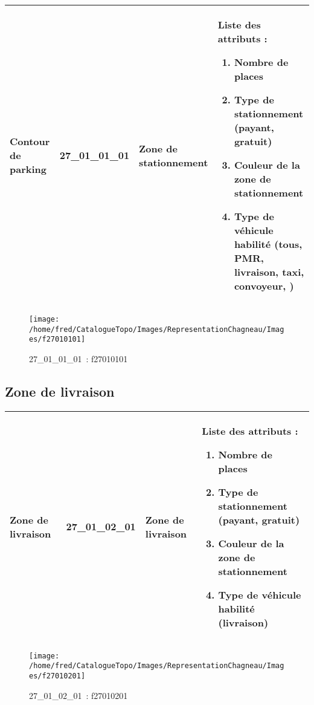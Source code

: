 \documentclass[12pt,titlepage]{book}
\begin{document}
\renewcommand{\arraystretch}{1.2}
\begin{supertabular}{|p{10cm}|c|p{13cm}|p{12cm}|}
 Contour de parking & 27\_01\_01\_01 & Zone de stationnement & Liste des attributs :
\begin{enumerate}
  \item Nombre de places  \item Type de stationnement (payant, gratuit)  \item Couleur de la zone de stationnement  \item Type de véhicule habilité (tous, PMR, livraison, taxi, convoyeur, )\end{enumerate}
\\
\hline
\end{supertabular}
\begin{figure}[h!]
  \hfill         %
  \begin{minipage}[t]{3cm}
    \begin{center}
      \texttt{[image: /home/fred/CatalogueTopo/Images/RepresentationChagneau/Images/f27010101]}
      \caption[~27\_01\_01\_01]{\small{27\_01\_01\_01~:} \tiny{f27010101}}\label{f27010101}
    \end{center}
  \end{minipage}
\end{figure}


\subsection{Zone de livraison}
\noindent
\vspace{\baselineskip}

\renewcommand{\arraystretch}{1.2}
\begin{supertabular}{|p{10cm}|c|p{13cm}|p{12cm}|}
 Zone de livraison & 27\_01\_02\_01 & Zone de livraison & Liste des attributs :
\begin{enumerate}
  \item Nombre de places  \item Type de stationnement (payant, gratuit)  \item Couleur de la zone de stationnement  \item Type de véhicule habilité (livraison)\end{enumerate}
\\
\hline
\end{supertabular}
\begin{figure}[h!]
  \hfill         %
  \begin{minipage}[t]{3cm}
    \begin{center}
      \texttt{[image: /home/fred/CatalogueTopo/Images/RepresentationChagneau/Images/f27010201]}
      \caption[~27\_01\_02\_01]{\small{27\_01\_02\_01~:} \tiny{f27010201}}\label{f27010201}
    \end{center}
  \end{minipage}
\end{figure}
\end{document}
